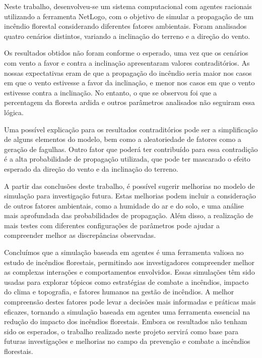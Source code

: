 Neste trabalho, desenvolveu-se um sistema computacional com agentes racionais utilizando a ferramenta NetLogo, com o objetivo de simular a propagação de um incêndio florestal considerando diferentes fatores ambientais. Foram analisados quatro cenários distintos, variando a inclinação do terreno e a direção do vento.

Os resultados obtidos não foram conforme o esperado, uma vez que os cenários com vento a favor e contra a inclinação apresentaram valores contraditórios. As nossas expectativas eram de que a propagação do incêndio seria maior nos casos em que o vento estivesse a favor da inclinação, e menor nos casos em que o vento estivesse contra a inclinação. No entanto, o que se observou foi que a percentagem da floresta ardida e outros parâmetros analisados não seguiram essa lógica.

Uma possível explicação para os resultados contraditórios pode ser a simplificação de alguns elementos do modelo, bem como a aleatoriedade de fatores como a geração de fagulhas. Outro fator que poderá ter contribuído para essa contradição é a alta probabilidade de propagação utilizada, que pode ter mascarado o efeito esperado da direção do vento e da inclinação do terreno.

A partir das conclusões deste trabalho, é possível sugerir melhorias no modelo de simulação para investigação futura. Estas melhorias podem incluir a consideração de outros fatores ambientais, como a humidade do ar e do solo, e uma análise mais aprofundada das probabilidades de propagação. Além disso, a realização de mais testes com diferentes configurações de parâmetros pode ajudar a compreender melhor as discrepâncias observadas.

Concluímos que a simulação baseada em agentes é uma ferramenta valiosa no estudo de incêndios florestais, permitindo aos investigadores compreender melhor as complexas interações e comportamentos envolvidos. Essas simulações têm sido usadas para explorar tópicos como estratégias de combate a incêndios, impacto do clima e topografia, e fatores humanos na gestão de incêndios. A melhor compreensão destes fatores pode levar a decisões mais informadas e práticas mais eficazes, tornando a simulação baseada em agentes uma ferramenta essencial na redução do impacto dos incêndios florestais. Embora os resultados não tenham sido os esperados, o trabalho realizado neste projeto servirá como base para futuras investigações e melhorias no campo da prevenção e combate a incêndios florestais.